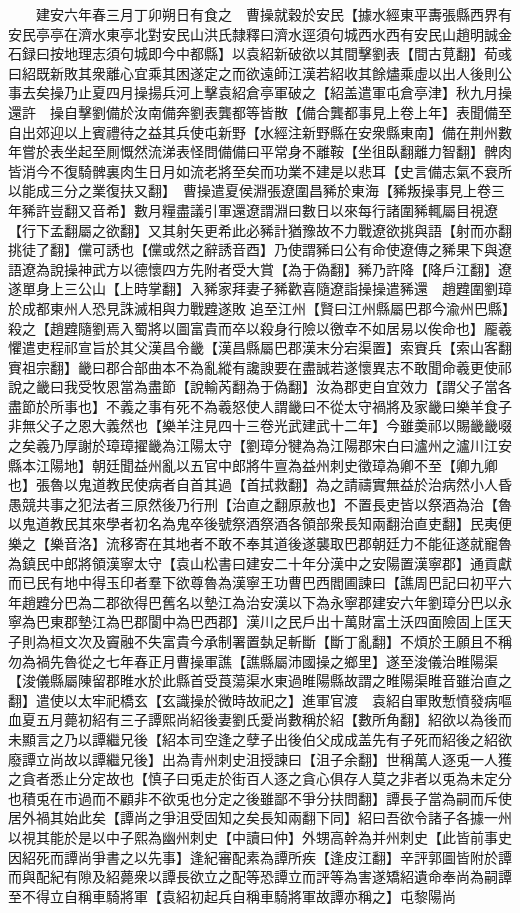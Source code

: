 　　建安六年春三月丁卯朔日有食之　曹操就穀於安民【據水經東平夀張縣西界有安民亭亭在濟水東亭北對安民山洪氏隸釋曰濟水逕須句城西水西有安民山趙明誠金石録曰按地理志須句城即今中都縣】以袁紹新破欲以其間擊劉表【間古莧翻】荀彧曰紹既新敗其衆離心宜乘其困遂定之而欲遠師江漢若紹收其餘燼乘虛以出人後則公事去矣操乃止夏四月操揚兵河上擊袁紹倉亭軍破之【紹盖遣軍屯倉亭津】秋九月操還許　操自擊劉備於汝南備奔劉表龔都等皆散【備合龔都事見上卷上年】表聞備至自出郊迎以上賓禮待之益其兵使屯新野【水經注新野縣在安衆縣東南】備在荆州數年嘗於表坐起至厠慨然流涕表怪問備備曰平常身不離鞍【坐徂臥翻離力智翻】髀肉皆消今不復騎髀裏肉生日月如流老將至矣而功業不建是以悲耳【史言備志氣不衰所以能成三分之業復扶又翻】　曹操遣夏侯淵張遼圍昌豨於東海【豨叛操事見上卷三年豨許豈翻又音希】數月糧盡議引軍還遼謂淵曰數日以來每行諸圍豨輒屬目視遼【行下孟翻屬之欲翻】又其射矢更希此必豨計猶豫故不力戰遼欲挑與語【射而亦翻挑徒了翻】儻可誘也【儻或然之辭誘音酉】乃使謂豨曰公有命使遼傳之豨果下與遼語遼為說操神武方以德懷四方先附者受大賞【為于偽翻】豨乃許降【降戶江翻】遼遂單身上三公山【上時掌翻】入豨家拜妻子豨歡喜隨遼詣操操遣豨還　趙韙圍劉璋於成都東州人恐見誅滅相與力戰韙遂敗追至江州【賢曰江州縣屬巴郡今渝州巴縣】殺之【趙韙隨劉焉入蜀將以圖富貴而卒以殺身行險以徼幸不如居易以俟命也】龎羲懼遣吏程祁宣旨於其父漢昌令畿【漢昌縣屬巴郡漢末分宕渠置】索賨兵【索山客翻賨祖宗翻】畿曰郡合部曲本不為亂縱有讒諛要在盡誠若遂懷異志不敢聞命羲更使祁說之畿曰我受牧恩當為盡節【說輸芮翻為于偽翻】汝為郡吏自宜效力【謂父子當各盡節於所事也】不義之事有死不為羲怒使人謂畿曰不從太守禍將及家畿曰樂羊食子非無父子之恩大義然也【樂羊注見四十三卷光武建武十二年】今雖羮祁以賜畿畿啜之矣羲乃厚謝於璋璋擢畿為江陽太守【劉璋分犍為為江陽郡宋白曰瀘州之瀘川江安縣本江陽地】朝廷聞益州亂以五官中郎將牛亶為益州刺史徵璋為卿不至【卿九卿也】張魯以鬼道教民使病者自首其過【首拭救翻】為之請禱實無益於治病然小人昏愚競共事之犯法者三原然後乃行刑【治直之翻原赦也】不置長吏皆以祭酒為治【魯以鬼道教民其來學者初名為鬼卒後號祭酒祭酒各領部衆長知兩翻治直吏翻】民夷便樂之【樂音洛】流移寄在其地者不敢不奉其道後遂襲取巴郡朝廷力不能征遂就寵魯為鎮民中郎將領漢寧太守【袁山松書曰建安二十年分漢中之安陽置漢寧郡】通貢獻而已民有地中得玉印者羣下欲尊魯為漢寧王功曹巴西閻圃諫曰【譙周巴記曰初平六年趙韙分巴為二郡欲得巴舊名以墊江為治安漢以下為永寧郡建安六年劉璋分巴以永寧為巴東郡墊江為巴郡閬中為巴西郡】漢川之民戶出十萬財富土沃四面險固上匡天子則為桓文次及竇融不失富貴今承制署置埶足斬斷【斷丁亂翻】不煩於王願且不稱勿為禍先魯從之七年春正月曹操軍譙【譙縣屬沛國操之鄉里】遂至浚儀治睢陽渠【浚儀縣屬陳留郡睢水於此縣首受莨蕩渠水東過睢陽縣故謂之睢陽渠睢音雖治直之翻】遣使以太牢祀橋玄【玄識操於微時故祀之】進軍官渡　袁紹自軍敗慙憤發病嘔血夏五月薨初紹有三子譚熙尚紹後妻劉氏愛尚數稱於紹【數所角翻】紹欲以為後而未顯言之乃以譚繼兄後【紹本司空逢之孽子出後伯父成成盖先有子死而紹後之紹欲廢譚立尚故以譚繼兄後】出為青州刺史沮授諫曰【沮子余翻】世稱萬人逐兎一人獲之貪者悉止分定故也【慎子曰兎走於街百人逐之貪心俱存人莫之非者以兎為未定分也積兎在市過而不顧非不欲兎也分定之後雖鄙不爭分扶問翻】譚長子當為嗣而斥使居外禍其始此矣【譚尚之爭沮受固知之矣長知兩翻下同】紹曰吾欲令諸子各據一州以視其能於是以中子熙為幽州刺史【中讀曰仲】外甥高幹為并州刺史【此皆前事史因紹死而譚尚爭書之以先事】逢紀審配素為譚所疾【逢皮江翻】辛評郭圖皆附於譚而與配紀有隙及紹薨衆以譚長欲立之配等恐譚立而評等為害遂矯紹遺命奉尚為嗣譚至不得立自稱車騎將軍【袁紹初起兵自稱車騎將軍故譚亦稱之】屯黎陽尚